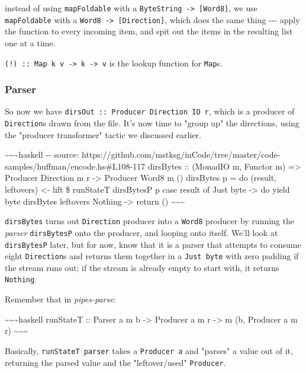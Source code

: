 \documentclass[]{article}
\begin{document}
instead of using \texttt{mapFoldable} with a
\texttt{ByteString\ -\textgreater{}\ {[}Word8{]}}, we use \texttt{mapFoldable}
with a \texttt{Word8\ -\textgreater{}\ {[}Direction{]}}, which does the same
thing -\/-\/- apply the function to every incoming item, and spit out the items
in the resulting list one at a time.

\texttt{(!)\ ::\ Map\ k\ v\ -\textgreater{}\ k\ -\textgreater{}\ v} is the
lookup function for \texttt{Map}s.

\subsubsection{Parser}

So now we have \texttt{dirsOut\ ::\ Producer\ Direction\ IO\ r}, which is a
producer of \texttt{Direction}s drawn from the file. It's now time to "group up"
the directions, using the "producer transformer" tactic we discussed earlier.

\textasciitilde{}\textasciitilde{}\textasciitilde{}haskell -\/- source:
https://github.com/mstksg/inCode/tree/master/code-samples/huffman/encode.hs\#L108-117
dirsBytes :: (MonadIO m, Functor m) =\textgreater{} Producer Direction m r
-\textgreater{} Producer Word8 m () dirsBytes p = do (result, leftovers)
\textless{}- lift \$ runStateT dirsBytesP p case result of Just byte
-\textgreater{} do yield byte dirsBytes leftovers Nothing -\textgreater{} return
() \textasciitilde{}\textasciitilde{}\textasciitilde{}

\texttt{dirsBytes} turns out \texttt{Direction} producer into a \texttt{Word8}
producer by running the \emph{parser} \texttt{dirsBytesP} onto the producer, and
looping onto itself. We'll look at \texttt{dirsBytesP} later, but for now, know
that it is a parser that attempts to consume eight \texttt{Direction}s and
returns them together in a \texttt{Just\ byte} with zero padding if the stream
runs out; if the stream is already empty to start with, it returns
\texttt{Nothing}.

Remember that in \emph{pipes-parse}:

\textasciitilde{}\textasciitilde{}\textasciitilde{}haskell runStateT :: Parser a
m b -\textgreater{} Producer a m r -\textgreater{} m (b, Producer a m r)
\textasciitilde{}\textasciitilde{}\textasciitilde{}

Basically, \texttt{runStateT\ parser} takes a \texttt{Producer\ a} and "parses"
a value out of it, returning the parsed value and the "leftover/used"
\texttt{Producer}.
\end{document}

